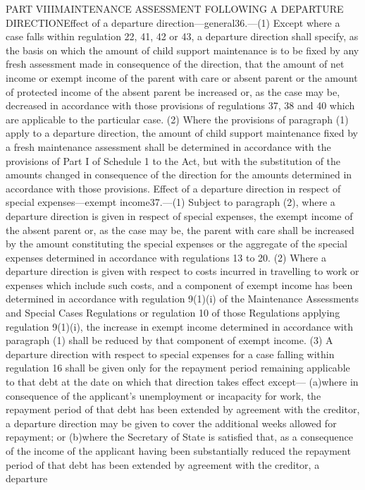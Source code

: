 \documentclass[a4paper]{article}
\begin{document}
PART VIIIMAINTENANCE ASSESSMENT FOLLOWING A DEPARTURE DIRECTIONEffect of a
departure direction—general36.—(1) Except where a case falls within regulation
22, 41, 42 or 43, a departure direction shall specify, as the basis on which the
amount of child support maintenance is to be fixed by any fresh assessment made
in consequence of the direction, that the amount of net income or exempt income
of the parent with care or absent parent or the amount of protected income of
the absent parent be increased or, as the case may be, decreased in accordance
with those provisions of regulations 37, 38 and 40 which are applicable to the
particular case.
(2) Where the provisions of paragraph (1) apply to a departure direction, the
amount of child support maintenance fixed by a fresh maintenance assessment
shall be determined in accordance with the provisions of Part I of Schedule 1 to
the Act, but with the substitution of the amounts changed in consequence of the
direction for the amounts determined in accordance with those provisions.
Effect of a departure direction in respect of special expenses—exempt
income37.—(1) Subject to paragraph (2), where a departure direction is given in
respect of special expenses, the exempt income of the absent parent or, as the
case may be, the parent with care shall be increased by the amount constituting
the special expenses or the aggregate of the special expenses determined in
accordance with regulations 13 to 20.
(2) Where a departure direction is given with respect to costs incurred in
travelling to work or expenses which include such costs, and a component of
exempt income has been determined in accordance with regulation 9(1)(i) of the
Maintenance Assessments and Special Cases Regulations or regulation 10 of those
Regulations applying regulation 9(1)(i), the increase in exempt income
determined in accordance with paragraph (1) shall be reduced by that component
of exempt income.
(3) A departure direction with respect to special expenses for a case falling
within regulation 16 shall be given only for the repayment period remaining
applicable to that debt at the date on which that direction takes effect except—
(a)where in consequence of the applicant’s unemployment or incapacity for work,
the repayment period of that debt has been extended by agreement with the
creditor, a departure direction may be given to cover the additional weeks
allowed for repayment; or
(b)where the Secretary of State is satisfied that, as a consequence of the
income of the applicant having been substantially reduced the repayment period
of that debt has been extended by agreement with the creditor, a departure
\end{document}
